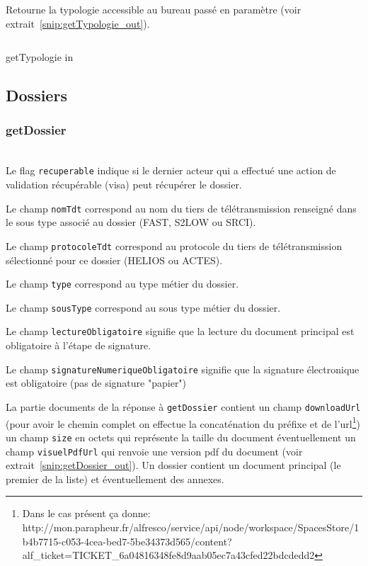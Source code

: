 Retourne la typologie accessible au bureau passé en paramètre (voir extrait~\ref{snip:getTypologie_out}).

\begin{codesnippet}
\inputminted[frame=single,linenos,fontsize=\footnotesize]{javascript}{extraits/getTypologie_in.js}
\caption{getTypologie in}
\label{snip:getTypologie_in}
\end{codesnippet}







\subsection{Dossiers}

\subsubsection{getDossier}
\\


Le flag \verb|recuperable| indique si le dernier acteur qui a effectué une action de validation récupérable (visa) peut récupérer le dossier.

Le champ \verb|nomTdt| correspond au nom du tiers de télétransmission renseigné dans le sous type associé au dossier (FAST, S2LOW ou SRCI).

Le champ \verb|protocoleTdt| correspond au protocole du tiers de télétransmission sélectionné pour ce dossier (HELIOS ou ACTES).

Le champ \verb|type| correspond au type métier du dossier.

Le champ \verb|sousType| correspond au sous type métier du dossier.

Le champ \verb|lectureObligatoire| signifie que la lecture du document principal est obligatoire à l'étape de signature.

Le champ \verb|signatureNumeriqueObligatoire| signifie que la signature électronique est obligatoire (pas de signature "papier")

La partie documents de la réponse à \verb|getDossier| contient un champ \verb|downloadUrl| (pour avoir le chemin complet on effectue la concaténation du préfixe et de l'url\footnote{Dans le cas présent ça donne: http://mon.parapheur.fr/alfresco/service/api/node/workspace/SpacesStore/1b4b7715-c053-4cea-bed7-5be34373d565/content?alf\_ticket=TICKET\_6a04816348fe8d9aab05ec7a43cfed22bdcdedd2}) un champ \verb|size| en octets qui représente la taille du document éventuellement un champ \verb|visuelPdfUrl| qui renvoie une version pdf du document (voir extrait~\ref{snip:getDossier_out}). Un dossier contient un document principal (le premier de la liste) et éventuellement des annexes.

